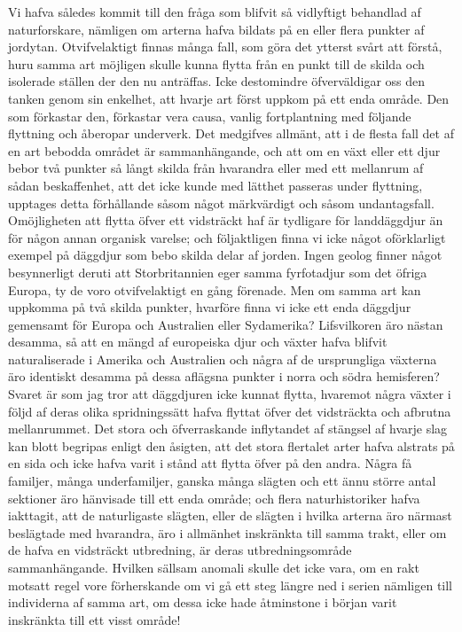 Vi hafva således kommit till den fråga som blifvit så vidlyftigt behandlad af naturforskare, nämligen om arterna hafva bildats på en eller flera punkter af jordytan. Otvifvelaktigt finnas många fall, som göra det ytterst svårt att förstå, huru samma art möjligen skulle kunna flytta från en punkt till de skilda och isolerade ställen der den nu anträffas. Icke destomindre öfverväldigar oss den tanken genom sin enkelhet, att hvarje art först uppkom på ett enda område. Den som förkastar den, förkastar vera causa, vanlig fortplantning med följande flyttning och åberopar underverk. Det medgifves allmänt, att i de flesta fall det af en art bebodda området är sammanhängande, och att om en växt eller ett djur bebor två punkter så långt skilda från hvarandra eller med ett mellanrum af sådan beskaffenhet, att det icke kunde med lätthet passeras under flyttning, upptages detta förhållande såsom något märkvärdigt och såsom undantagsfall. Omöjligheten att flytta öfver ett vidsträckt haf är tydligare för landdäggdjur än för någon annan organisk varelse; och följaktligen finna vi icke något oförklarligt exempel på däggdjur som bebo skilda delar af jorden. Ingen geolog finner något besynnerligt deruti att Storbritannien eger samma fyrfotadjur som det öfriga Europa, ty de voro otvifvelaktigt en gång förenade. Men om samma art kan uppkomma på två skilda punkter, hvarföre finna vi icke ett enda däggdjur gemensamt för Europa och Australien eller Sydamerika? Lifsvilkoren äro nästan desamma, så att en mängd af europeiska djur och växter hafva blifvit naturaliserade i Amerika och Australien och några af de ursprungliga växterna äro identiskt desamma på dessa aflägsna punkter i norra och södra hemisferen? Svaret är som jag tror att däggdjuren icke kunnat flytta, hvaremot några växter i följd af deras olika spridningssätt hafva flyttat öfver det vidsträckta och afbrutna mellanrummet. Det stora och öfverraskande inflytandet af stängsel af hvarje slag kan blott begripas enligt den åsigten, att det stora flertalet arter hafva alstrats på en sida och icke hafva varit i stånd att flytta öfver på den andra. Några få familjer, många underfamiljer, ganska många slägten och ett ännu större antal sektioner äro hänvisade till ett enda område; och flera naturhistoriker hafva iakttagit, att de naturligaste slägten, eller de slägten i hvilka arterna äro närmast beslägtade med hvarandra, äro i allmänhet inskränkta till samma trakt, eller om de hafva en vidsträckt utbredning, är deras utbredningsområde sammanhängande. Hvilken sällsam anomali skulle det icke vara, om en rakt motsatt regel vore förherskande om vi gå ett steg längre ned i serien nämligen till individerna af samma art, om dessa icke hade åtminstone i början varit inskränkta till ett visst område!

